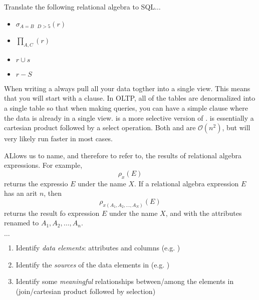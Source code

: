 \documentclass{article}
\begin{document}
\begin{example}
  Translate the following relational algebra to SQL$\dots$
  \begin{itemize}
    \item $\sigma_{A=B \textrm{ \^{} } D>5}(r)$ \\ 
    \item $\prod_{A,C}(r)$ \\ 
    \item $r \cup s$ \\ 
    \item $r - S$ \\ 
  \end{itemize}
\end{example}

When writing a  always pull all your data togther into a single view. This means that you will start with a  clause. In OLTP, all of the tables are denormalized into a single table so that when making queries, you can have a simple  clause where the data is already in a single view.  is a more selective version of .  is essentially a cartesian product followed by a select operation. Both  and  are $\mathcal{O}(n^2)$, but  will very likely run faster in most cases. \\ 

\begin{definition}
  ALlows us to name, and therefore to refer to, the results of relational algebra expressions. For example, $$\rho_{x}(E)$$ returns the expressio $E$ under the name $X$. If a relational algebra expression $E$ has an arit $n$, then $$\rho_{x(A_1 , A_2 , \dots , A_N)}(E)$$ returns the result fo expression $E$ under the name $X$, and with the attributes renamed to $A_1 , A_2 , \dots , A_n$. 
\end{definition}

$\dots$ 
\begin{enumerate}
  \item Identify \emph{data elements}: attributes and columns (e.g. )
  \item Identify the \emph{sources} of the data elements in  (e.g. )
  \item Identify some \emph{meaningful} relationships between/among the elements in  (join/cartesian product followed by selection)
\end{enumerate}
\end{document}
